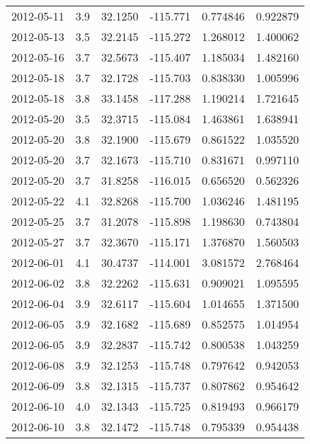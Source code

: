 \begin{tabular}{lrrrrr}
2012-05-11 &       3.9 &  32.1250 &  -115.771 &         0.774846 &         0.922879 \\
2012-05-13 &       3.5 &  32.2145 &  -115.272 &         1.268012 &         1.400062 \\
2012-05-16 &       3.7 &  32.5673 &  -115.407 &         1.185034 &         1.482160 \\
2012-05-18 &       3.7 &  32.1728 &  -115.703 &         0.838330 &         1.005996 \\
2012-05-18 &       3.8 &  33.1458 &  -117.288 &         1.190214 &         1.721645 \\
2012-05-20 &       3.5 &  32.3715 &  -115.084 &         1.463861 &         1.638941 \\
2012-05-20 &       3.8 &  32.1900 &  -115.679 &         0.861522 &         1.035520 \\
2012-05-20 &       3.7 &  32.1673 &  -115.710 &         0.831671 &         0.997110 \\
2012-05-20 &       3.7 &  31.8258 &  -116.015 &         0.656520 &         0.562326 \\
2012-05-22 &       4.1 &  32.8268 &  -115.700 &         1.036246 &         1.481195 \\
2012-05-25 &       3.7 &  31.2078 &  -115.898 &         1.198630 &         0.743804 \\
2012-05-27 &       3.7 &  32.3670 &  -115.171 &         1.376870 &         1.560503 \\
2012-06-01 &       4.1 &  30.4737 &  -114.001 &         3.081572 &         2.768464 \\
2012-06-02 &       3.8 &  32.2262 &  -115.631 &         0.909021 &         1.095595 \\
2012-06-04 &       3.9 &  32.6117 &  -115.604 &         1.014655 &         1.371500 \\
2012-06-05 &       3.9 &  32.1682 &  -115.689 &         0.852575 &         1.014954 \\
2012-06-05 &       3.9 &  32.2837 &  -115.742 &         0.800538 &         1.043259 \\
2012-06-08 &       3.9 &  32.1253 &  -115.748 &         0.797642 &         0.942053 \\
2012-06-09 &       3.8 &  32.1315 &  -115.737 &         0.807862 &         0.954642 \\
2012-06-10 &       4.0 &  32.1343 &  -115.725 &         0.819493 &         0.966179 \\
2012-06-10 &       3.8 &  32.1472 &  -115.748 &         0.795339 &         0.954438 \\

\end{tabular}
